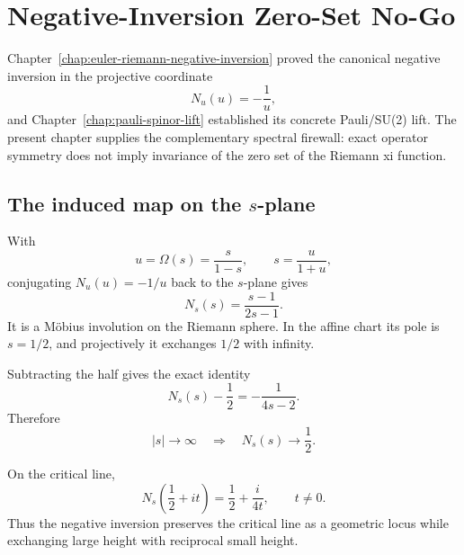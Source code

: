\chapter{Negative-Inversion Zero-Set No-Go}
\label{chap:negative-inversion-zero-set-no-go}


Chapter~\ref{chap:euler-riemann-negative-inversion} proved the canonical
negative inversion in the projective coordinate
\[
 N_u(u)=-\frac1u,
\]
and Chapter~\ref{chap:pauli-spinor-lift} established its concrete Pauli/SU(2)
lift.  The present chapter supplies the complementary spectral firewall: exact
operator symmetry does not imply invariance of the zero set of the Riemann xi
function.

\section{The induced map on the $s$-plane}

With
\[
 u=\Omega(s)=\frac{s}{1-s},
 \qquad
 s=\frac{u}{1+u},
\]
conjugating $N_u(u)=-1/u$ back to the $s$-plane gives
\begin{equation}
 \boxed{
 N_s(s)=\frac{s-1}{2s-1}.
 }
 \label{eq:g014-Ns}
\end{equation}
It is a Möbius involution on the Riemann sphere.  In the affine chart its pole
is $s=1/2$, and projectively it exchanges $1/2$ with infinity.

Subtracting the half gives the exact identity
\begin{equation}
 \boxed{
 N_s(s)-\frac12=-\frac1{4s-2}.
 }
 \label{eq:g014-half-defect}
\end{equation}
Therefore
\begin{equation}
 |s|\longrightarrow\infty
 \quad\Longrightarrow\quad
 N_s(s)\longrightarrow\frac12.
 \label{eq:g014-contraction}
\end{equation}

On the critical line,
\begin{equation}
 \boxed{
 N_s\!\left(\frac12+it\right)
 =\frac12+\frac{i}{4t},
 \qquad t\ne0.
 }
 \label{eq:g014-critical-height}
\end{equation}
Thus the negative inversion preserves the critical line as a geometric locus
while exchanging large height with reciprocal small height.

